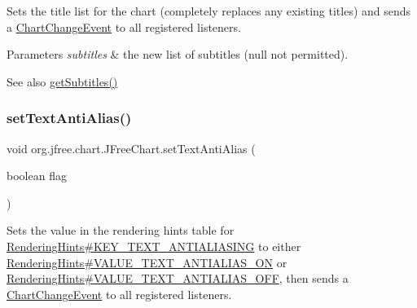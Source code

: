 Sets the title list for the chart (completely replaces any existing titles) and sends a \mbox{\hyperlink{}{Chart\+Change\+Event}} to all registered listeners.


\begin{DoxyParams}{Parameters}
{\em subtitles} & the new list of subtitles ({\ttfamily null} not permitted).\\
\hline
\end{DoxyParams}
\begin{DoxySeeAlso}{See also}
\mbox{\hyperlink{classorg_1_1jfree_1_1chart_1_1_j_free_chart_ae2ec05a9cb012173d7982409ee9b8c6b}{get\+Subtitles()}} 
\end{DoxySeeAlso}
\mbox{\label{classorg_1_1jfree_1_1chart_1_1_j_free_chart_aedfada089f57c36fbd4c5ea025aacb7f}} 
\subsubsection{\texorpdfstring{set\+Text\+Anti\+Alias()}{setTextAntiAlias()}\hspace{0.1cm}{\footnotesize\ttfamily [1/2]}}
{\footnotesize\ttfamily void org.\+jfree.\+chart.\+J\+Free\+Chart.\+set\+Text\+Anti\+Alias (\begin{DoxyParamCaption}\item[{boolean}]{flag }\end{DoxyParamCaption})}

Sets the value in the rendering hints table for \mbox{\hyperlink{}{Rendering\+Hints\#\+K\+E\+Y\+\_\+\+T\+E\+X\+T\+\_\+\+A\+N\+T\+I\+A\+L\+I\+A\+S\+I\+NG}} to either \mbox{\hyperlink{}{Rendering\+Hints\#\+V\+A\+L\+U\+E\+\_\+\+T\+E\+X\+T\+\_\+\+A\+N\+T\+I\+A\+L\+I\+A\+S\+\_\+\+ON}} or \mbox{\hyperlink{}{Rendering\+Hints\#\+V\+A\+L\+U\+E\+\_\+\+T\+E\+X\+T\+\_\+\+A\+N\+T\+I\+A\+L\+I\+A\+S\+\_\+\+O\+FF}}, then sends a \mbox{\hyperlink{}{Chart\+Change\+Event}} to all registered listeners.


